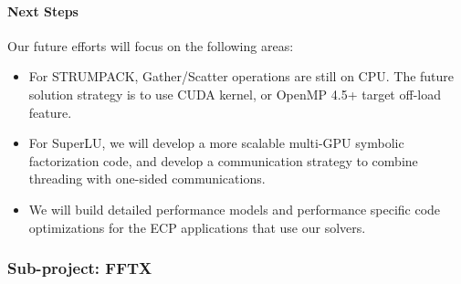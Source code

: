 \paragraph{Next Steps} Our future efforts will focus on the following areas:
\begin{itemize}
\item For STRUMPACK, Gather/Scatter operations are still on CPU. The future
 solution strategy is to use CUDA kernel, or OpenMP 4.5+ target off-load feature.
\item For SuperLU, we will develop a more scalable multi-GPU symbolic
  factorization code, and develop a communication strategy to 
  combine threading with one-sided communications.
\item We will build detailed performance models and performance specific
  code optimizations for the ECP applications that use our solvers.
\end{itemize}


\subsubsection{ Sub-project: FFTX} \label{subsubsect:fftx}
\noindent

